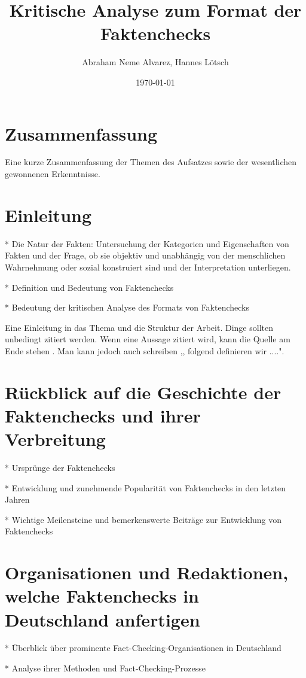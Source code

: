 \documentclass[a4paper,listof=totoc,bibliography=totoc]{scrartcl}
\title{Kritische Analyse zum Format der Faktenchecks}
\author{Abraham Neme Alvarez, Hannes Lötsch}
\date{\today}
\begin{document}
\maketitle

\section{Zusammenfassung}

Eine kurze Zusammenfassung der Themen des Aufsatzes sowie der wesentlichen
gewonnenen Erkenntnisse.

\section{Einleitung}

* Die Natur der Fakten: Untersuchung der Kategorien und Eigenschaften von Fakten und der Frage, 
ob sie objektiv und unabhängig von der menschlichen Wahrnehmung oder sozial konstruiert sind und der Interpretation unterliegen.

* Definition und Bedeutung von Faktenchecks

* Bedeutung der kritischen Analyse des Formats von Faktenchecks

Eine Einleitung in das Thema und die Struktur der Arbeit. Dinge sollten
unbedingt zitiert werden. Wenn eine Aussage zitiert wird, kann die Quelle
am Ende stehen \cite{popper:2005}. Man kann jedoch auch schreiben
,,\citet{feyerabend:1986} folgend definieren wir ....".

\section{Rückblick auf die Geschichte der Faktenchecks und ihrer Verbreitung}

* Ursprünge der Faktenchecks

* Entwicklung und zunehmende Popularität von Faktenchecks in den letzten Jahren

* Wichtige Meilensteine und bemerkenswerte Beiträge zur Entwicklung von Faktenchecks

\section{Organisationen und Redaktionen, welche Faktenchecks in Deutschland anfertigen}

* Überblick über prominente Fact-Checking-Organisationen in Deutschland

* Analyse ihrer Methoden und Fact-Checking-Prozesse
\end{document}
